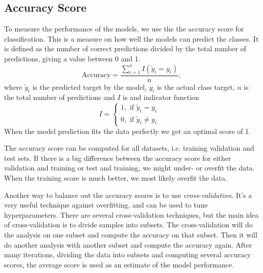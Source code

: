 \documentclass[a4paper, american, 12pt]{report}
\begin{document}
	\subsection{Accuracy Score}
	\label{subsect:Theory-Accuracy}
	To measure the performance of the models, we use the the accuracy score for classification. This is a measure on how well the models can predict the classes. It is defined as the number of correct predictions divided by the total number of predictions, giving a value between 0 and 1. 
	\begin{equation}
	\label{eq:AccuracyScore}
		\text{Accuracy}=\frac{\sum_{i=1}^nI(\tilde{y}_i=y_i)}{n},
	\end{equation}
	where $\tilde{y}_i$ is the predicted target by the model, $y_i$ is the actual class target, $n$ is the total number of predictions and $I$ is and indicator function
	\begin{equation}
	\label{eq:IndicatorFunc}
		I = \begin{cases*}
			1, \text{ if $\tilde{y}_i=y_i$ }\\
			0, \text{ if $\tilde{y}_i\neq y_i$}
			\end{cases*}
	\end{equation}
	When the model prediction fits the data perfectly we get an optimal score of 1. 
	
	The accuracy score can be computed for all datasets, i.e. training validation and test sets. If there is a big difference between the accuracy score for either validation and training or test and training, we might under- or overfit the data. When the training score is much better, we most likely overfit the data.
	
	Another way to balance out the accuracy scores is to use \textit{cross-validation}. It's a very useful technique against overfitting, and can be used to tune hyperparameters. There are several cross-validation techniques, but the main idea of cross-validation is to divide samples into subsets. The cross-validation will do the analysis on one subset and compute the accuracy on that subset. Then it will do another analysis with another subset and compute the accuracy again. After many iterations, dividing the data into subsets and computing several accuracy scores, the average score is used as an estimate of the model performance. 
	
	
\end{document}
